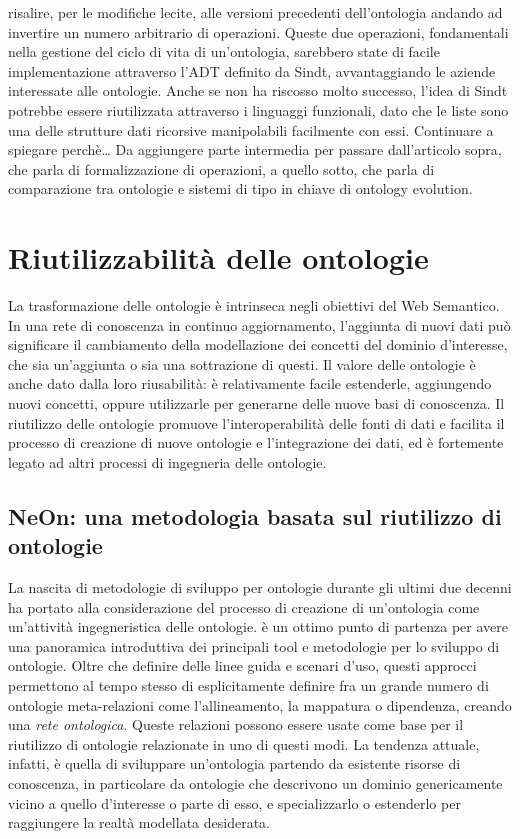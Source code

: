 risalire, per le modifiche lecite, alle versioni precedenti dell'ontologia andando ad invertire un numero arbitrario di operazioni.
Queste due operazioni, fondamentali nella gestione del ciclo di vita di un'ontologia, sarebbero state di facile implementazione attraverso l'ADT definito da Sindt, avvantaggiando le aziende interessate alle ontologie. Anche se non ha riscosso molto successo, l'idea di Sindt potrebbe essere riutilizzata attraverso i linguaggi funzionali, dato che le liste sono una delle strutture dati ricorsive manipolabili facilmente con essi. Continuare a spiegare perchè…
Da aggiungere parte intermedia per passare dall'articolo sopra, che parla di formalizzazione di operazioni, a quello sotto, che parla di comparazione tra ontologie e sistemi di tipo in chiave di ontology evolution.


\section{Riutilizzabilità delle ontologie}
\label{sec:OntoReuse}
La trasformazione delle ontologie è intrinseca negli obiettivi del Web Semantico. In una rete di conoscenza in continuo aggiornamento, l'aggiunta di nuovi dati può significare il cambiamento della modellazione dei concetti del dominio d'interesse, che sia un'aggiunta o sia una sottrazione di questi. Il valore delle ontologie è anche dato dalla loro riusabilità: è relativamente facile estenderle, aggiungendo nuovi concetti, oppure utilizzarle per generarne delle nuove basi di conoscenza. Il riutilizzo delle ontologie promuove l'interoperabilità delle fonti di dati e facilita il processo di creazione di nuove ontologie e l'integrazione dei dati, ed è fortemente legato ad altri processi di ingegneria delle ontologie.
\subsection{NeOn: una metodologia basata sul riutilizzo di ontologie}
La nascita di metodologie di sviluppo per ontologie durante gli ultimi due decenni ha portato alla considerazione del processo di creazione di un'ontologia come un'attività ingegneristica delle ontologie. \cite{iqbal2013analysis} è un ottimo punto di partenza per avere una panoramica introduttiva dei principali tool e metodologie per lo sviluppo di ontologie. Oltre che definire delle linee guida e scenari d'uso, questi approcci permettono al tempo stesso di esplicitamente definire fra un grande numero di ontologie meta-relazioni  come l'allineamento, la mappatura \cite{choi2006Mapping} o dipendenza, creando una \textit{rete ontologica}. Queste relazioni possono essere usate come base per il riutilizzo di ontologie relazionate in uno di questi modi. La tendenza attuale, infatti, è quella di sviluppare un'ontologia partendo da esistente risorse di conoscenza, in particolare da ontologie che descrivono un dominio genericamente vicino a quello d'interesse o parte di esso, e specializzarlo o estenderlo per raggiungere la realtà modellata desiderata.

